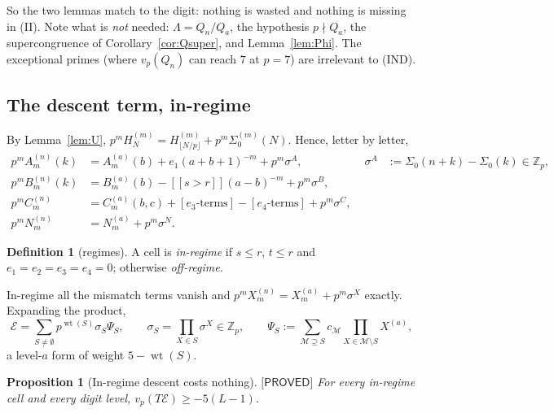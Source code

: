 \documentclass[11pt,reqno]{amsart}
\theoremstyle{plain}
\newtheorem{proposition}[theorem]{Proposition}
\theoremstyle{definition}
\newtheorem{definition}[theorem]{Definition}
\theoremstyle{remark}
\numberwithin{equation}{section}
\newcommand{\ZZ}{\mathbb{Z}}
\newcommand{\Zp}{\ZZ_p}
\newcommand{\wt}{\operatorname{wt}}
\newcommand{\ii}[1]{[\![#1]\!]}
\newcommand{\Ecal}{\mathcal{E}}
\newcommand{\Mcal}{\mathcal{M}}
\newcommand{\PROVED}{\textsf{[PROVED]}}
\begin{document}
So the two lemmas match to the digit: nothing is wasted and nothing is missing in (II). Note
what is \emph{not} needed: $\Lambda=Q_n/Q_a$, the hypothesis $p\nmid Q_a$, the supercongruence
of Corollary~\ref{cor:Qsuper}, and Lemma~\ref{lem:Phi}. The exceptional primes (where
$v_p(Q_n)$ can reach $7$ at $p=7$) are irrelevant to (IND).

\subsection{The descent term, in-regime}

By Lemma~\ref{lem:U}, $p^mH^{(m)}_N=H^{(m)}_{\lfloor N/p\rfloor}+p^m\Sigma^{(m)}_0(N)$. Hence,
letter by letter,
\begin{equation}\label{eq:letterdescent}
\begin{aligned}
p^mA_m^{(n)}(k)&=A_m^{(a)}(b)+e_1(a+b+1)^{-m}+p^m\sigma^A, &\quad \sigma^A&:=\Sigma_0(n+k)-\Sigma_0(k)\in\Zp,\\
p^mB_m^{(n)}(k)&=B_m^{(a)}(b)-\ii{s>r}(a-b)^{-m}+p^m\sigma^B,\\
p^mC_m^{(n)}&=C_m^{(a)}(b,c)+[e_3\text{-terms}]-[e_4\text{-terms}]+p^m\sigma^C,\\
p^mN_m^{(n)}&=N_m^{(a)}+p^m\sigma^N .
\end{aligned}
\end{equation}

\begin{definition}[regimes]\label{def:regime}
A cell is \emph{in-regime} if $s\le r$, $t\le r$ and $e_1=e_2=e_3=e_4=0$; otherwise
\emph{off-regime}.
\end{definition}

In-regime all the mismatch terms vanish and $p^mX^{(n)}_m=X^{(a)}_m+p^m\sigma^X$ exactly.
Expanding the product,
\[
\Ecal=\sum_{S\ne\emptyset}p^{\wt(S)}\sigma_S\Psi_S,\qquad
\sigma_S=\prod_{X\in S}\sigma^X\in\Zp,\qquad
\Psi_S:=\sum_{\Mcal\supseteq S}c_\Mcal\prod_{X\in\Mcal\setminus S}X^{(a)},
\]
a level-$a$ form of weight $5-\wt(S)$.

\begin{proposition}[In-regime descent costs nothing]\label{prop:inregime}
$\PROVED$ For every in-regime cell and every digit level, $v_p(T\Ecal)\ge-5(L-1)$.
\end{proposition}
\end{document}
